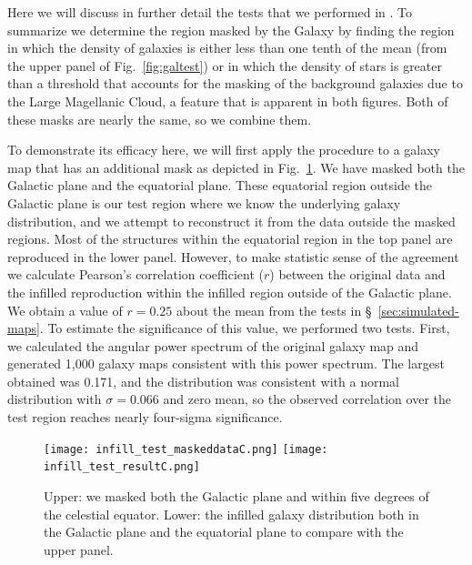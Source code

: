 \documentclass[useAMS,usenatbib]{mn2e}
\begin{document}
Here we will discuss in further detail the tests that we performed in
\citet{2016arXiv160207710A}.  To summarize we determine the region
masked by the Galaxy by finding the region in which the density of
galaxies is either less than one tenth of the mean (from the upper
panel of Fig.~\ref{fig:galtest}) or in which the density of stars
\citep[from Fig.~2][]{2016arXiv160207710A} is greater than a threshold
that accounts for the masking of the background galaxies due to the
Large Magellanic Cloud, a feature that is apparent in both figures.
Both of these masks are nearly the same, so we combine them.

To demonstrate its efficacy here, we will first apply the procedure to
a galaxy map that has an additional mask as depicted in
Fig.~\ref{fig:infilling_test}.  We have masked both the Galactic plane
and the equatorial plane.  These equatorial region outside the
Galactic plane is our test region where we know the underlying galaxy
distribution, and we attempt to reconstruct it from the data outside
the masked regions.  Most of the structures within the equatorial
region in the top panel are reproduced in the lower panel.  However,
to make statistic sense of the agreement we calculate Pearson's
correlation coefficient ($r$) between the original data and the
infilled reproduction within the infilled region outside of the
Galactic plane.  We obtain a value of $r=0.25$ about the mean from the
tests in \S~\ref{sec:simulated-maps}.  To estimate the significance of
this value, we performed two tests.  First, we calculated the angular
power spectrum of the original galaxy map and generated 1,000 galaxy
maps consistent with this power spectrum.  The largest obtained was
0.171, and the distribution was consistent with a normal distribution
with $\sigma=0.066$ and zero mean, so the observed correlation over
the test region reaches nearly four-sigma significance.
\begin{figure}
  \texttt{[image: infill\_test\_maskeddataC.png]}
  \texttt{[image: infill\_test\_resultC.png]}
  \caption{Upper: we masked both the Galactic plane and within
    five degrees of the celestial equator.  Lower: the infilled galaxy
    distribution both in the Galactic plane and the equatorial plane
    to compare with the upper panel.}
  \label{fig:infilling_test}
\end{figure}
\end{document}
